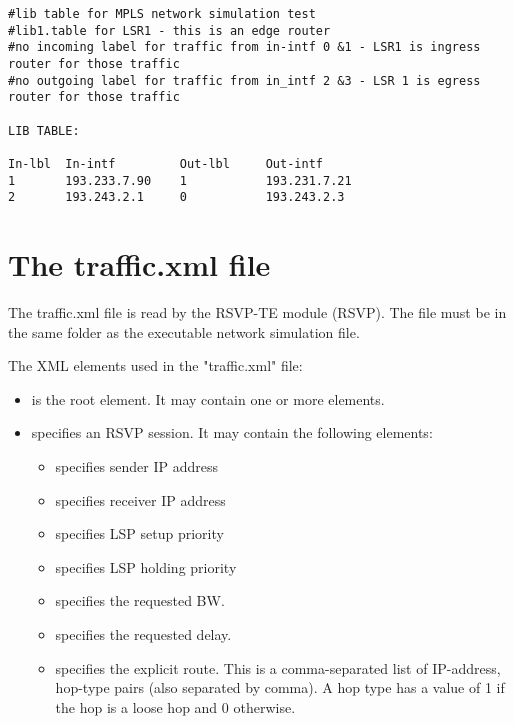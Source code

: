 \begin{verbatim}
#lib table for MPLS network simulation test
#lib1.table for LSR1 - this is an edge router
#no incoming label for traffic from in-intf 0 &1 - LSR1 is ingress router for those traffic
#no outgoing label for traffic from in_intf 2 &3 - LSR 1 is egress router for those traffic

LIB TABLE:

In-lbl  In-intf         Out-lbl     Out-intf
1       193.233.7.90    1           193.231.7.21
2       193.243.2.1     0           193.243.2.3
\end{verbatim}


\section{The traffic.xml file}

The traffic.xml file is read by the RSVP-TE module (RSVP).
The file must be in the same folder as the executable
network simulation file.

The XML elements used in the "traffic.xml" file:

\begin{itemize}
  \item {} is the root element. It may contain one or more  elements.
  \item {} specifies an RSVP session. It may contain the following elements:
  \begin{itemize}
    \item {} specifies sender IP address
    \item {} specifies receiver IP address
    \item {} specifies LSP setup priority
    \item {} specifies LSP holding priority
    \item {} specifies the requested BW.
    \item {} specifies the requested delay.
    \item {} specifies the explicit route. This is a comma-separated
      list of IP-address, hop-type pairs (also separated by comma).
      A hop type has a value of 1 if the hop is a loose hop and 0 otherwise.
  \end{itemize}
\end{itemize}

